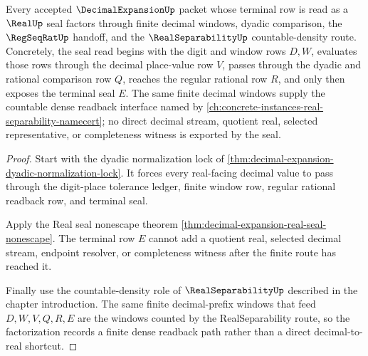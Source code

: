 \begin{theorem}\label{thm:decimal-expansion-real-seal-factorization}
Every accepted $\DecimalExpansionUp$ packet whose terminal row is read as a $\RealUp$ seal factors through finite decimal windows, dyadic comparison, the $\RegSeqRatUp$ handoff, and the $\RealSeparabilityUp$ countable-density route. Concretely, the seal read begins with the digit and window rows $D,W$, evaluates those rows through the decimal place-value row $V$, passes through the dyadic and rational comparison row $Q$, reaches the regular rational row $R$, and only then exposes the terminal seal $E$. The same finite decimal windows supply the countable dense readback interface named by \autoref{ch:concrete-instances-real-separability-namecert}; no direct decimal stream, quotient real, selected representative, or completeness witness is exported by the seal.
\end{theorem}
\begin{proof}
Start with the dyadic normalization lock of \autoref{thm:decimal-expansion-dyadic-normalization-lock}. It forces every real-facing decimal value to pass through the digit-place tolerance ledger, finite window row, regular rational readback row, and terminal seal.

Apply the Real seal nonescape theorem \autoref{thm:decimal-expansion-real-seal-nonescape}. The terminal row $E$ cannot add a quotient real, selected decimal stream, endpoint resolver, or completeness witness after the finite route has reached it.

Finally use the countable-density role of $\RealSeparabilityUp$ described in the chapter introduction. The same finite decimal-prefix windows that feed $D,W,V,Q,R,E$ are the windows counted by the RealSeparability route, so the factorization records a finite dense readback path rather than a direct decimal-to-real shortcut.
\end{proof}

